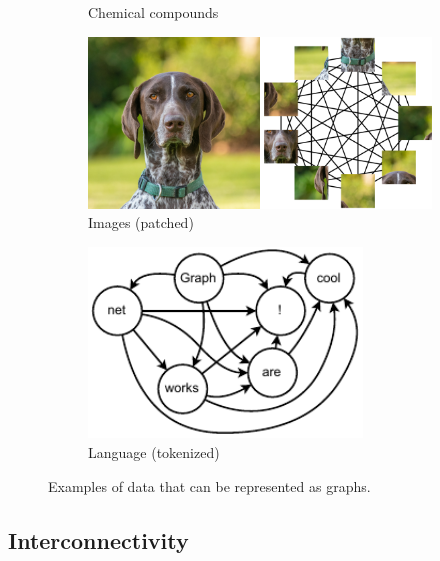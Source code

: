 \begin{figure}
\begin{subfigure}[b]{0.45\textwidth}
        \caption{Chemical compounds}
        \label{fig:chemical}
    \end{subfigure}
    \begin{subfigure}[b]{0.45\textwidth}
        \centering
        \includegraphics[width=\textwidth]{Figures/transformers/patched_image.png}
        \caption{Images (patched)}
        \label{fig:dog}
    \end{subfigure}
    \begin{subfigure}[b]{0.45\textwidth}
        \centering
        \includegraphics[width=0.8\textwidth]{Figures/transformers/text.pdf}
        \caption{Language (tokenized)}
        \label{fig:text}
    \end{subfigure}
    \caption{Examples of data that can be represented as graphs.}
    \label{fig:graph_examples}
\end{figure}

\subsection{Interconnectivity}

